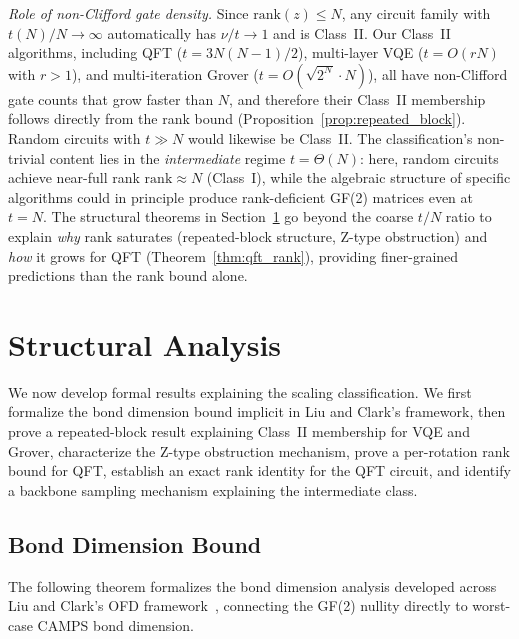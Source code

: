 \documentclass[a4paper,twocolumn,11pt]{quantumarticle}
\begin{document}
\emph{Role of non-Clifford gate density.}
Since $\mathrm{rank}(z) \le N$, any circuit family with $t(N)/N \to \infty$ automatically has $\nu/t \to 1$ and is Class~II.
Our Class~II algorithms, including QFT ($t = 3N(N-1)/2$), multi-layer VQE ($t = O(rN)$ with $r > 1$), and multi-iteration Grover ($t = O(\sqrt{2^N} \cdot N)$), all have non-Clifford gate counts that grow faster than $N$, and therefore their Class~II membership follows directly from the rank bound (Proposition~\ref{prop:repeated_block}).
Random circuits with $t \gg N$ would likewise be Class~II.
The classification's non-trivial content lies in the \emph{intermediate} regime $t = \Theta(N)$: here, random circuits achieve near-full rank $\mathrm{rank} \approx N$ (Class~I), while the algebraic structure of specific algorithms could in principle produce rank-deficient GF(2) matrices even at $t = N$.
The structural theorems in Section~\ref{sec:structure} go beyond the coarse $t/N$ ratio to explain \emph{why} rank saturates (repeated-block structure, Z-type obstruction) and \emph{how} it grows for QFT (Theorem~\ref{thm:qft_rank}), providing finer-grained predictions than the rank bound alone.

\section{Structural Analysis}
\label{sec:structure}

We now develop formal results explaining the scaling classification.
We first formalize the bond dimension bound implicit in Liu and Clark's framework, then prove a repeated-block result explaining Class~II membership for VQE and Grover, characterize the Z-type obstruction mechanism, prove a per-rotation rank bound for QFT, establish an exact rank identity for the QFT circuit, and identify a backbone sampling mechanism explaining the intermediate class.

\subsection{Bond Dimension Bound}

The following theorem formalizes the bond dimension analysis developed across Liu and Clark's OFD framework~\cite{Liu2024}, connecting the GF(2) nullity directly to worst-case CAMPS bond dimension.
\end{document}
